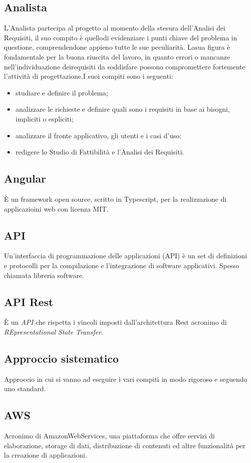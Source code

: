 \subsection*{Analista} L’Analista partecipa al progetto al momento della stesura dell’Analisi dei Requisiti, il suo compito è quellodi evidenziare i punti chiave del problema in questione, comprendendone appieno tutte le sue peculiarità. Lasua figura è fondamentale per la buona riuscita del lavoro, in quanto errori o mancanze nell’individuazione deirequisiti da soddisfare possono compromettere fortemente l’attività di progettazione.I suoi compiti sono i seguenti:
\begin{itemize}
    \item studiare e definire il problema;
    \item analizzare le richieste e definire quali sono i requisiti in base ai bisogni, impliciti o espliciti;
    \item analizzare il fronte applicativo, gli utenti e i casi d’uso;
    \item redigere lo Studio di Fattibilità e l’Analisi dei Requisiti.
\end{itemize}
\subsection*{Angular} È un framework open source, scritto in Typescript, per la realizzazione di applicazioini web con licenza MIT.
\subsection*{API} Un'interfaccia di programmazione delle applicazioni (API) è un set di definizioni e protocolli per la compilazione e l'integrazione di software applicativi. Spesso chiamata libreria software.
\subsection*{API Rest} È un \textit{API} che rispetta i vincoli imposti dall'architettura Rest acronimo di \textit{REpresentational State Transfer}.
\subsection*{Approccio sistematico} Approccio in cui si vanno ad eseguire i vari compiti in modo rigoroso e seguendo uno standard.
\subsection*{AWS} Acronimo di AmazonWebServices, una piattaforma che offre servizi di elaborazione, storage di dati, distribuzione di contenuti ed altre funzionalità per la creazione di applicazioni.
